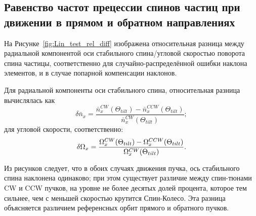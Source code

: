 \subsection{Равенство частот прецессии спинов частиц при движении в прямом и обратном направлениях}\label{chpt3:imperfections:CW_vs_CCW}
На Рисунке~\ref{fig:Lin_test_rel_diff} изображена относительная разница между радиальной компонентой оси стабильного спина/угловой скоростью поворота спина частицы, соответственно для случайно-распределённой ошибки наклона элементов, и в случае попарной компенсации наклонов.

Для радиальной компоненты оси стабильного спина, относительная разница вычислялась как 
\[
\delta\bar n_x = \frac{\bar n_x^{CW}(\Theta_{tilt}) - \bar n_x^{CCW}(\Theta_{tilt})}{\bar n_x^{CW}(\Theta_{tilt})};
\]
для угловой скорости, соответственно:
\[
\delta\Omega_x = \frac{\Omega_x^{CW}(\Theta_{tilt}) - \Omega_x^{CCW}(\Theta_{tilt})}{\Omega_x^{CW}(\Theta_{tilt})}.
\]

Из рисунков следует, что в обоих случаях движения пучка, ось стабильного спина наклонена одинаково; при этом существует различие между спин-тюнами CW и CCW пучков, на уровне не более десятых долей процента, которое тем сильнее, чем с меньшей скоростью крутится Спин-Колесо. Эта разница объясняется различием референсных орбит прямого и обратного пучков. 


